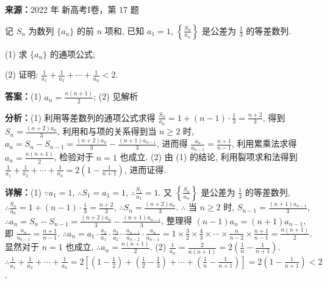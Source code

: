 \begin{question}[points=10]
\textbf{来源：}2022 年 新高考I卷，第 17 题\par
记 $S_n$ 为数列 $\{a_n\}$ 的前 $n$ 项和, 已知 $a_1 = 1$, $\left\{\frac{S_n}{a_n}\right\}$ 是公差为 $\frac{1}{3}$ 的等差数列.

(1) 求 $\{a_n\}$ 的通项公式;

(2) 证明: $\frac{1}{a_1} + \frac{1}{a_2} + \cdots + \frac{1}{a_n} < 2$.
\begin{solution}
\textbf{答案：}(1) $a_n = \frac{n(n+1)}{2}$; (2) 见解析

\textbf{分析：}(1) 利用等差数列的通项公式求得 $\frac{S_n}{a_n} = 1 + (n-1)\cdot\frac{1}{3} = \frac{n+2}{3}$, 得到 $S_n = \frac{(n+2)a_n}{3}$, 利用和与项的关系得到当 $n \ge 2$ 时, $a_n = S_n - S_{n-1} = \frac{(n+2)a_n}{3} - \frac{(n+1)a_{n-1}}{3}$, 进而得 $\frac{a_n}{a_{n-1}} = \frac{n+1}{n-1}$, 利用累乘法求得 $a_n = \frac{n(n+1)}{2}$, 检验对于 $n=1$ 也成立. (2) 由 (1) 的结论, 利用裂项求和法得到 $\frac{1}{a_1} + \frac{1}{a_2} + \cdots + \frac{1}{a_n} = 2\left(1 - \frac{1}{n+1}\right)$, 进而证得.

\textbf{详解：}(1) $\because a_1 = 1$, $\therefore S_1 = a_1 = 1$, $\therefore \frac{S_1}{a_1} = 1$. 又 $\left\{\frac{S_n}{a_n}\right\}$ 是公差为 $\frac{1}{3}$ 的等差数列, $\therefore \frac{S_n}{a_n} = 1 + (n-1)\cdot\frac{1}{3} = \frac{n+2}{3}$, $\therefore S_n = \frac{(n+2)a_n}{3}$. $\therefore$ 当 $n \ge 2$ 时, $S_{n-1} = \frac{(n+1)a_{n-1}}{3}$, $\therefore a_n = S_n - S_{n-1} = \frac{(n+2)a_n}{3} - \frac{(n+1)a_{n-1}}{3}$, 整理得 $(n-1)a_n = (n+1)a_{n-1}$, 即 $\frac{a_n}{a_{n-1}} = \frac{n+1}{n-1}$. $\therefore a_n = a_1 \cdot \frac{a_2}{a_1} \cdot \frac{a_3}{a_2} \cdots \frac{a_{n-1}}{a_{n-2}} \cdot \frac{a_n}{a_{n-1}} = 1 \times \frac{3}{2} \times \frac{4}{3} \times \cdots \times \frac{n}{n-2} \times \frac{n+1}{n-1} = \frac{n(n+1)}{2}$. 显然对于 $n=1$ 也成立, $\therefore a_n = \frac{n(n+1)}{2}$.
(2) $\frac{1}{a_n} = \frac{2}{n(n+1)} = 2\left(\frac{1}{n} - \frac{1}{n+1}\right)$. $\therefore \frac{1}{a_1} + \frac{1}{a_2} + \cdots + \frac{1}{a_n} = 2\left[\left(1-\frac{1}{2}\right) + \left(\frac{1}{2}-\frac{1}{3}\right) + \cdots + \left(\frac{1}{n} - \frac{1}{n+1}\right)\right] = 2\left(1 - \frac{1}{n+1}\right) < 2$.
\end{solution}
\end{question}

